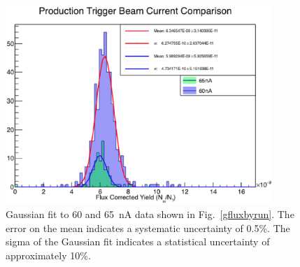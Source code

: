 \begin{figure}[htpb]
\begin{center}
 \includegraphics[width=0.9\textwidth]{figures/gflux/60vs65comparison_withparameters.eps}
  \caption{Gaussian fit to 60 and 65~nA data shown in Fig.~\ref{gfluxbyrun}. The error on the mean indicates a systematic uncertainty of 0.5\%. The sigma of the Gaussian fit indicates a statistical uncertainty of approximately 10\%.}
  \label{gfluxbyrun_pull}
  \end{center}
\end{figure}

